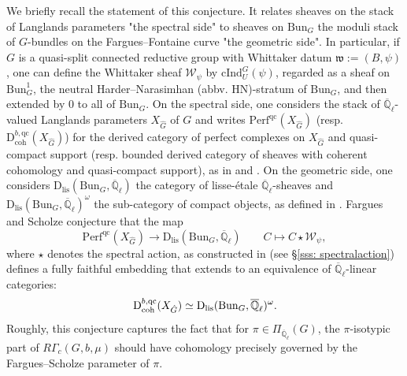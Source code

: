 \documentclass[reqno,11pt]{amsart}
\theoremstyle{remark}
\newcommand{\mf}{\mathfrak}
\newcommand{\Q}{\mathbb{Q}}
\newcommand{\ov}{\overline}
\newcommand{\Bun}{\mathrm{Bun}}
\newcommand{\Dc}{\mathrm{D}}
\newcommand{\Dlis}{\mathrm{D}_{\mathrm{lis}}}
\newcommand{\Perf}{\mathrm{Perf}}
\def\ol{\overline}
\def\ra{\rightarrow}
\begin{document}
We briefly recall the statement of this conjecture. It relates sheaves on the stack of Langlands parameters "the spectral side" to sheaves on $\Bun_{G}$ the moduli stack of $G$-bundles on the Fargues--Fontaine curve "the geometric side". In particular, if $G$ is a quasi-split connected reductive group with Whittaker datum $\mf{w} := (B,\psi)$, one can define the Whittaker sheaf $\mathcal{W}_{\psi}$ by $\mathrm{cInd}_{U}^{G}(\psi)$, regarded as a sheaf on $\Bun_{G}^{1}$, the neutral Harder--Narasimhan (abbv. HN)-stratum of $\Bun_{G}$, and then extended by $0$ to all of $\Bun_{G}$. On the spectral side, one considers the stack of $\ol{\mathbb{Q}}_{\ell}$-valued Langlands parameters $X_{\hat{G}}$ of $G$ and writes $\Perf^{\mathrm{qc}}(X_{\hat{G}})$ (resp. $\Dc^{b,\mathrm{qc}}_{\mathrm{coh}}(X_{\hat{G}})$) for the derived category of perfect complexes on $X_{\hat{G}}$ and quasi-compact support (resp. bounded derived category of sheaves with coherent cohomology and quasi-compact support), as in \cite{DH,Zhu1} and \cite[Section~VIII.I]{FS}. On the geometric side, one considers $\Dlis(\Bun_{G},\ol{\mathbb{Q}}_{\ell})$ the category of lisse-\'etale $\ol{\mathbb{Q}}_{\ell}$-sheaves and $\Dlis(\Bun_{G},\ol{\mathbb{Q}}_{\ell})^{\omega}$ the sub-category of compact objects, as defined in \cite[Section~VII.7]{FS}. Fargues and Scholze conjecture that the map 
\[ \Perf^{\mathrm{qc}}(X_{\hat{G}}) \ra \Dlis(\Bun_{G},\ol{\mathbb{Q}}_{\ell}) \quad \quad C \mapsto C \star \mathcal{W}_{\psi}, \]
where $\star$ denotes the spectral action, as constructed in \cite[Chapter~X]{FS} (see \S \ref{sss: spectralaction}) defines a fully faithful embedding that extends to an equivalence of $\ol{\mathbb{Q}}_{\ell}$-linear categories:
\begin{equation}{\label{eqn: introFSconj}}
    \Dc_{\mathrm{coh}}^{b,\mathrm{qc}}(X_{\hat{G}}) \simeq  \Dlis(\Bun_{G},\ol{\mathbb{Q}}_{\ell})^{\omega}.
\end{equation}
Roughly, this conjecture captures the fact that for $\pi \in \Pi_{\ov{\Q}_{\ell}}(G)$, the $\pi$-isotypic part of $R\Gamma_c(G,b,\mu)$ should have cohomology precisely governed by the Fargues--Scholze parameter of $\pi$. 
\end{document}
